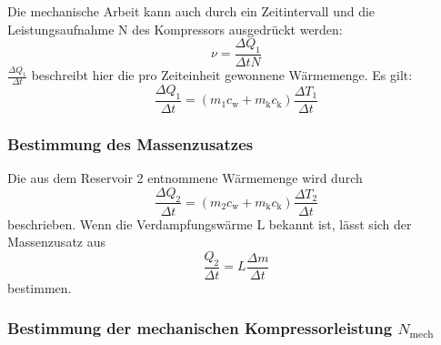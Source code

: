     Die mechanische Arbeit kann auch durch ein Zeitintervall und die Leistungsaufnahme N des Kompressors ausgedrückt werden:
    \begin{equation}
        \nu = \frac{\Delta Q_1}{\Delta t N}
    \end{equation}
    $\frac{\Delta Q_1}{\Delta t}$ beschreibt hier die pro Zeiteinheit gewonnene Wärmemenge. Es gilt:
    \begin{equation}
        \frac{\Delta Q_1}{\Delta t} = (m_1 c_\text{w} + m_\text{k} c_\text{k}) \frac{\Delta T_1}{\Delta t}
    \end{equation}

\subsubsection{Bestimmung des Massenzusatzes}

    Die aus dem Reservoir 2 entnommene Wärmemenge wird durch
    \begin{equation}
        \frac{\Delta Q_2}{\Delta t} =(m_2 c_\text{w} + m_\text{k} c_\text{k}) \frac{\Delta T_2}{\Delta t}
    \end{equation}
    beschrieben.
    Wenn die Verdampfungswärme L bekannt ist, lässt sich der Massenzusatz aus
    \begin{equation}
        \frac{Q_2}{\Delta t} = L \frac{\Delta m}{\Delta t}
    \end{equation}
    bestimmen.

\subsubsection{Bestimmung der mechanischen Kompressorleistung $N_\text{mech}$}

